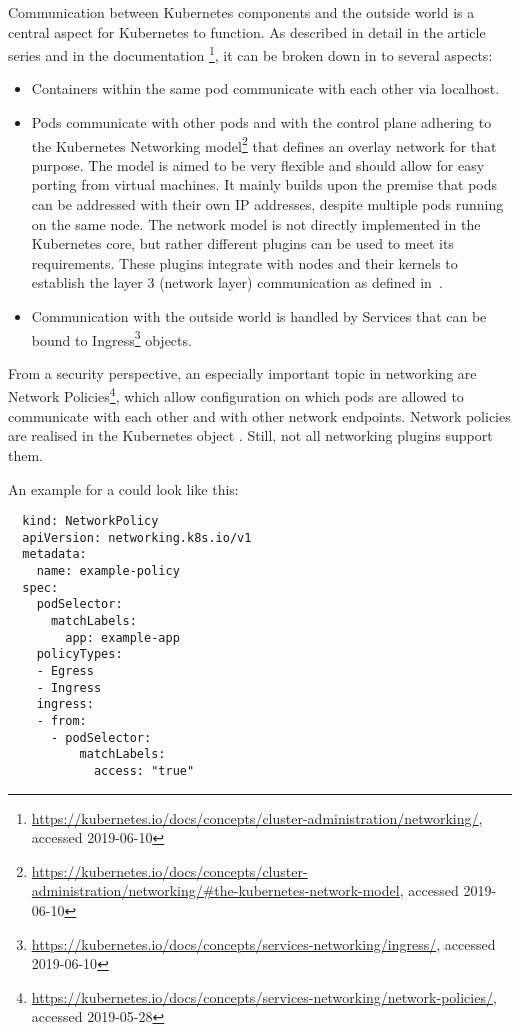 Communication between Kubernetes components and the outside world is a central aspect for Kubernetes to function. As described in detail in the article series \textcite{NetworkingExplained} and in the documentation \textcite{k8sdocs}\footnote{\url{https://kubernetes.io/docs/concepts/cluster-administration/networking/}, accessed 2019-06-10}, it can be broken down in to several aspects:

\begin{itemize}
    \item Containers within the same pod communicate with each other via localhost.
    \item Pods communicate with other pods and with the control plane adhering to the Kubernetes Networking model\footnote{\url{https://kubernetes.io/docs/concepts/cluster-administration/networking/\#the-kubernetes-network-model}, accessed 2019-06-10} that defines an overlay network for that purpose. The model is aimed to be very flexible and should allow for easy porting from virtual machines. It mainly builds upon the premise that pods can be addressed with their own IP addresses, despite multiple pods running on the same node. The network model is not directly implemented in the Kubernetes core, but rather different plugins can be used to meet its requirements. These plugins integrate with nodes and their kernels to establish the layer 3 (network layer) communication as defined in~\textcite{osiModel}.
    \item Communication with the outside world is handled by Services that can be bound to  Ingress\footnote{\url{https://kubernetes.io/docs/concepts/services-networking/ingress/}, accessed 2019-06-10} objects. %
\end{itemize}

From a security perspective, an especially important topic in networking are Network Policies\footnote{\url{https://kubernetes.io/docs/concepts/services-networking/network-policies/}, accessed 2019-05-28}, which allow configuration on which pods are allowed to communicate with each other and with other network endpoints. Network policies are realised in the Kubernetes object . Still, not all networking plugins support them.

An example for a  could look like this:

\begin{verbatim}
  kind: NetworkPolicy
  apiVersion: networking.k8s.io/v1
  metadata:
    name: example-policy
  spec:
    podSelector:
      matchLabels:
        app: example-app
    policyTypes:
    - Egress
    - Ingress
    ingress:
    - from:
      - podSelector:
          matchLabels:
            access: "true"
\end{verbatim}


